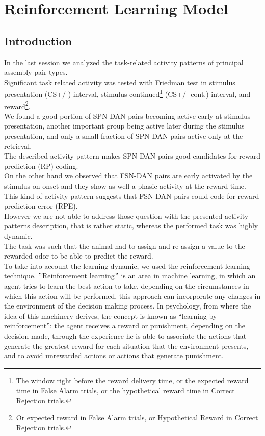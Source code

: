 \chapter{Reinforcement Learning Model}
\label{chap:RL}
\section{Introduction}
In the last session we analyzed the task-related activity patterns of principal assembly-pair types.\\Significant task related activity was tested with Friedman test in stimulus presentation (CS+/-) interval, stimulus continued\footnote{The window right before the reward delivery time, or the expected reward time in False Alarm trials, or the hypothetical reward time in Correct Rejection trials.} (CS+/- cont.) interval, and reward\footnote{Or expected reward in False Alarm trials, or Hypothetical Reward in Correct Rejection trials.}.\\We found a good portion of SPN-DAN pairs becoming active early at stimulus presentation, another important group being active later during the stimulus presentation, and only a small fraction of SPN-DAN pairs active only at the retrieval.\\The described activity pattern makes SPN-DAN pairs good candidates for reward prediction (RP) coding.\\On the other hand we observed that FSN-DAN pairs are early activated by the stimulus on onset and they show as well a phasic activity at the reward time.\\This kind of activity pattern suggests that FSN-DAN pairs could code for reward prediction error (RPE).\\However we are not able to address those question with the presented activity patterns description, that is rather static, whereas the performed task was highly dynamic.\\The task was such that the animal had to assign and re-assign a value to the rewarded odor to be able to predict the reward.\\To take into account the learning dynamic, we used the reinforcement learning technique. $"$Reinforcement learning$"$ is an area in machine learning, in which an agent tries to learn the best action to take, depending on the circumstances in which this action will be performed, this approach can incorporate any changes in the environment of the decision making process. In psychology, from where the idea of this machinery derives, the concept is known as “learning by reinforcement”: the agent receives a reward or punishment, depending on the decision made, through the experience he is able to associate the actions that generate the greatest reward for each situation that the environment presents, and to avoid unrewarded actions or actions that generate punishment.\\
